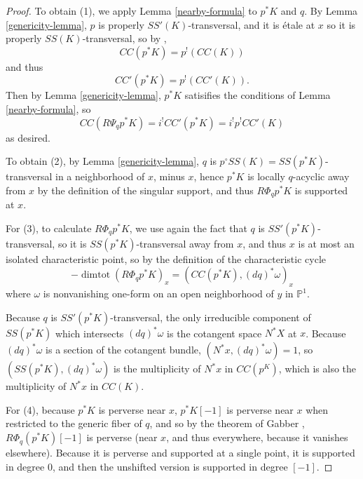\documentclass[12pt]{amsart}
\theoremstyle{definition}
\theoremstyle{remark}
\begin{document}
\begin{proof} To obtain (1), we apply Lemma \ref{nearby-formula} to $p^* K$ and $q$. By Lemma \ref{genericity-lemma}, $p$ is properly $SS'(K)$-transversal, and it is \'{e}tale at $x$ so it is properly $SS(K)$-transversal, so by \cite[Theorem 6.6]{saito1}, \[CC(p^* K) = p^!(CC(K))\] and thus \[CC'(p^* K) = p^!(CC'(K)).\] Then by Lemma \ref{genericity-lemma}, $p^* K$ satisifies the conditions of Lemma \ref{nearby-formula}, so \[ CC ( R \Psi_{q} p^*K) = i^! CC'(p^* K) = i^! p^! CC'(K) \] as desired. 

To obtain (2), by Lemma \ref{genericity-lemma}, $q $ is $ p^\circ SS(K)= SS(p^* K)$-transversal in a neighborhood of $x$, minus $x$, hence  $p^* K$ is locally $q$-acyclic away from $x$  by the definition of the singular support,  and thus $R \Phi_q p^* K$ is supported at $x$.



For (3), to calculate $R \Phi_q p^*K $, we use again the fact that $q $ is $ SS'(p^* K)$-transversal, so it is $SS(p^*K)$-transversal away from $x$, and thus $x$ is at most an isolated characteristic point, so by the definition of the characteristic cycle \[ -\operatorname{dimtot} (R \Phi_q p^* K)_x = (CC (p^* K), (dq)^* \omega)_x\] where $\omega$ is nonvanishing one-form on an open neighborhood of $y$ in $\mathbb P^1$.

Because $q$ is $SS'(p^*K)$-transversal, the only irreducible component of $SS(p^*K)$ which intersects $(dq)^* \omega $ is the cotangent space $N^* X$ at $x$. Because $(dq)^* \omega$ is a section of the cotangent bundle, $(N^*x, (dq)^* \omega)= 1$, so $(SS(p^*K), (dq)^* \omega)$ is the multiplicity of $N^*x$ in $CC(p^K)$, which is also the multiplicity of $N^* x$ in $CC(K)$.

For (4), because $p^*K$ is perverse near $x$, $p^* K[-1]$ is perverse near $x$ when restricted to the generic fiber of $q$, and so by the theorem of Gabber \cite[Corollary 4.6]{Illusie}, $R\Phi_q ( p^* K)[-1]$ is perverse (near $x$, and thus everywhere, because it vanishes elsewhere). Because it is perverse and supported at a single point, it is supported in degree $0$, and then the unshifted version is supported in degree $[-1]$.

\end{proof}
\end{document}
